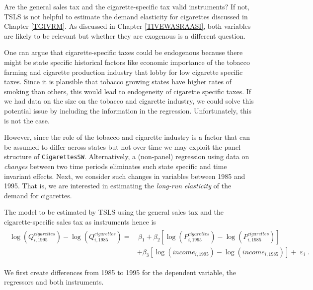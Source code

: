 \documentclass[
  14pt,
]{memoir}
\DeclareMathOperator{\eps}{\varepsilon}
\begin{document}
Are the general sales tax and the cigarette-specific tax valid instruments? If not, TSLS is not helpful to estimate the demand elasticity for cigarettes discussed in Chapter \ref{TGIVRM}. As discussed in Chapter \ref{TIVEWASRAASI}, both variables are likely to be relevant but whether they are exogenous is a different question.

One can argue that cigarette-specific taxes could be endogenous because there might be state specific historical factors like economic importance of the tobacco farming and cigarette production industry that lobby for low cigarette specific taxes. Since it is plausible that tobacco growing states have higher rates of smoking than others, this would lead to endogeneity of cigarette specific taxes. If we had data on the size on the tobacco and cigarette industry, we could solve this potential issue by including the information in the regression. Unfortunately, this is not the case.

However, since the role of the tobacco and cigarette industry is a factor that can be assumed to differ across states but not over time we may exploit the panel structure of \texttt{CigarettesSW}. Alternatively, a (non-panel) regression using data on \emph{changes} between two time periods eliminates such state specific and time invariant effects. Next, we consider such changes in variables between 1985 and 1995. That is, we are interested in estimating the \emph{long-run elasticity} of the demand for cigarettes.

The model to be estimated by TSLS using the general sales tax and the cigarette-specific sales tax as instruments hence is
\begin{align}
\begin{split}
  \log(Q_{i,1995}^{cigarettes}) - \log(Q_{i,1985}^{cigarettes}) =
  & \, \beta_1 + \beta_2 \left[\log(P_{i,1995}^{cigarettes}) - \log(P_{i,1985}^{cigarettes}) \right] \\ 
  &+ \beta_3 \left[\log(income_{i,1995}) - \log(income_{i,1985})\right] + \eps_i. \end{split}\label{eq:diffivreg}
\end{align}

We first create differences from 1985 to 1995 for the dependent variable, the regressors and both instruments.
\end{document}
